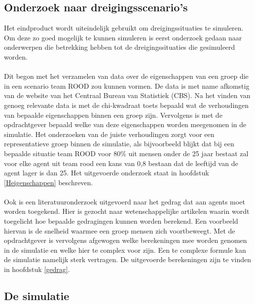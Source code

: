 \documentclass[12pt, letterpaper]{article}
\begin{document}
\subsection{Onderzoek naar dreigingsscenario's}
Het eindproduct wordt uiteindelijk gebruikt om dreigingssituaties te simuleren. Om deze zo goed mogelijk te kunnen simuleren is eerst onderzoek gedaan naar onderwerpen die betrekking hebben tot de dreigingssituaties die gesimuleerd worden. 
\\ \\
Dit begon met het verzamelen van data over de eigenschappen van een groep die in een scenario team ROOD zou kunnen vormen. De data is met name afkomstig van de website van het Centraal Bureau van Statistiek (CBS). Na het vinden van genoeg relevante data is met de chi-kwadraat toets bepaald wat de verhoudingen van bepaalde eigenschappen binnen een groep zijn. Vervolgens is met de opdrachtgever bepaald welke van deze eigenschappen worden meegenomen in de simulatie. Het onderzoeken van de juiste verhoudingen zorgt voor een representatieve groep binnen de simulatie, als bijvoorbeeld blijkt dat bij een bepaalde situatie team ROOD voor 80\% uit mensen onder de 25 jaar bestaat zal voor elke agent uit team rood een kans van 0,8 bestaan dat de leeftijd van de agent lager is dan 25. Het uitgevoerde onderzoek staat in hoofdstuk \ref{Heigenschappen} beschreven. \\ \\
Ook is een literatuuronderzoek uitgevoerd naar het gedrag dat aan agents moet worden toegekend. Hier is gezocht naar wetenschappelijke artikelen waarin wordt toegelicht hoe bepaalde gedragingen kunnen worden berekend. Een voorbeeld hiervan is de snelheid waarmee een groep mensen zich voortbeweegt. Met de opdrachtgever is vervolgens afgewogen welke berekeningen mee worden genomen in de simulatie en welke hier te complex voor zijn. Een te complexe formule kan de simulatie namelijk sterk vertragen. De uitgevoerde berekeningen zijn te vinden in hoofdstuk \ref{gedrag}.

\subsection{De simulatie}
\end{document}
